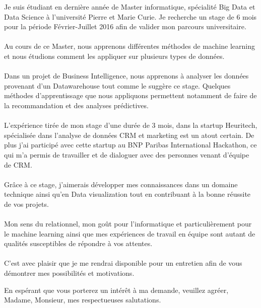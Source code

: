 \documentclass[11pt,a4paper,sans]{moderncv} %
\begin{document}
\date{} %
\opening{} %


\makelettertitle %

\begin{flushleft}
Je suis étudiant en dernière année de Master informatique, spécialité Big Data et Data Science à l'université Pierre et Marie Curie. Je recherche un stage de 6 mois pour la période Février-Juillet 2016 afin de valider mon parcours universitaire.\\~\\

Au cours de ce Master, nous apprenons différentes méthodes de machine learning et nous étudions comment les appliquer sur plusieurs types de données.\\~\\

Dans un projet de Business Intelligence, nous apprenons à analyser les données provenant d'un Datawarehouse tout comme le suggère ce stage. Quelques méthodes d'apprentissage que nous appliquons permettent notamment de faire de la recommandation et des analyses prédictives.\\~\\

L'expérience tirée de mon stage d'une durée de 3 mois, dans la startup Heuritech, spécialisée dans l'analyse de données CRM et marketing est un atout certain. De plus j'ai participé avec cette startup au BNP Paribas International Hackathon, ce qui m'a permis de travailler et de dialoguer avec des personnes venant d'équipe de CRM.\\~\\

Grâce à ce stage, j'aimerais développer mes connaissances dans un domaine technique ainsi qu'en Data visualization tout en contribuant à la bonne réussite de vos projets.\\~\\

Mon sens du relationnel, mon goût pour l'informatique et particulièrement pour le machine learning ainsi que mes expériences de travail en équipe sont autant de qualités susceptibles de répondre à vos attentes.\\~\\

C'est avec plaisir que je me rendrai disponible pour un entretien afin de vous démontrer mes possibilités et motivations.

\end{flushleft}


\closing{En espérant que vous porterez un intérêt à ma demande, veuillez agréer, Madame, Monsieur, mes respectueuses salutations.} %

\makeletterclosing %
\end{document}
